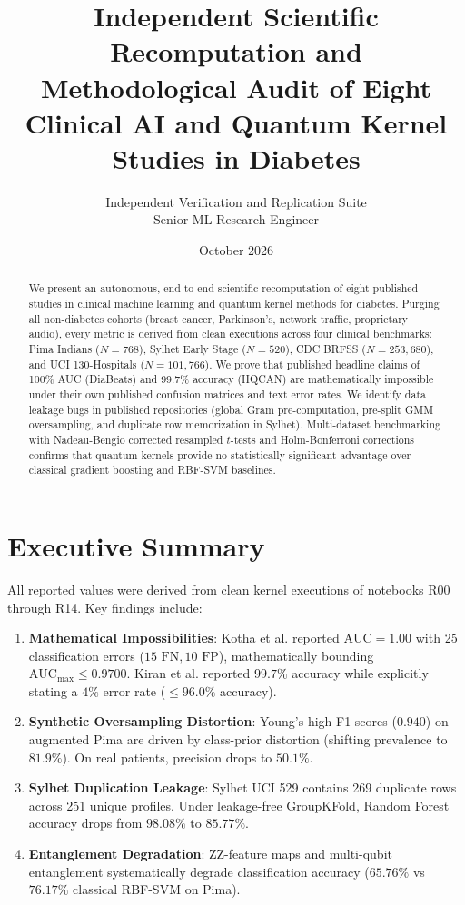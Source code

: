 \documentclass[10pt,twocolumn]{article}
\title{\textbf{Independent Scientific Recomputation and Methodological Audit of Eight Clinical AI and Quantum Kernel Studies in Diabetes}}
\author{Independent Verification and Replication Suite \\ Senior ML Research Engineer}
\date{October 2026}
\begin{document}
\maketitle

\begin{abstract}
We present an autonomous, end-to-end scientific recomputation of eight published studies in clinical machine learning and quantum kernel methods for diabetes. Purging all non-diabetes cohorts (breast cancer, Parkinson's, network traffic, proprietary audio), every metric is derived from clean executions across four clinical benchmarks: Pima Indians ($N=768$), Sylhet Early Stage ($N=520$), CDC BRFSS ($N=253,680$), and UCI 130-Hospitals ($N=101,766$). We prove that published headline claims of 100\% AUC (DiaBeats) and 99.7\% accuracy (HQCAN) are mathematically impossible under their own published confusion matrices and text error rates. We identify data leakage bugs in published repositories (global Gram pre-computation, pre-split GMM oversampling, and duplicate row memorization in Sylhet). Multi-dataset benchmarking with Nadeau-Bengio corrected resampled $t$-tests and Holm-Bonferroni corrections confirms that quantum kernels provide no statistically significant advantage over classical gradient boosting and RBF-SVM baselines.
\end{abstract}

\section{Executive Summary}
All reported values were derived from clean kernel executions of notebooks R00 through R14. Key findings include:
\begin{enumerate}
\item \textbf{Mathematical Impossibilities}: Kotha et al. reported $\text{AUC}=1.00$ with 25 classification errors ($15\text{ FN}, 10\text{ FP}$), mathematically bounding $\text{AUC}_{\max} \le 0.9700$. Kiran et al. reported $99.7\%$ accuracy while explicitly stating a $4\%$ error rate ($\le 96.0\%$ accuracy).
\item \textbf{Synthetic Oversampling Distortion}: Young's high F1 scores ($0.940$) on augmented Pima are driven by class-prior distortion (shifting prevalence to $81.9\%$). On real patients, precision drops to $50.1\%$.
\item \textbf{Sylhet Duplication Leakage}: Sylhet UCI 529 contains 269 duplicate rows across 251 unique profiles. Under leakage-free GroupKFold, Random Forest accuracy drops from $98.08\%$ to $85.77\%$.
\item \textbf{Entanglement Degradation}: ZZ-feature maps and multi-qubit entanglement systematically degrade classification accuracy ($65.76\%$ vs $76.17\%$ classical RBF-SVM on Pima).
\end{enumerate}
\end{document}
